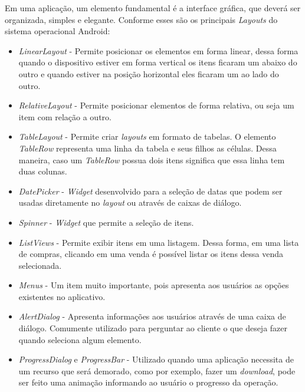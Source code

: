 	\par Em uma aplicação, um elemento fundamental é a interface gráfica, que
deverá ser organizada, simples e elegante. Conforme 
esses são os principais \textit{Layouts} do sistema operacional Android:
	\begin{itemize}
	
	 \item \textit{LinearLayout} - Permite posicionar os elementos em forma
	 linear, dessa forma quando o dispositivo estiver em forma vertical os itens
	 ficaram um abaixo do outro e quando estiver na posição horizontal eles
	 ficaram um ao lado do outro.
	
	  \item \textit{RelativeLayout} - Permite posicionar elementos de forma
	  relativa, ou seja um item com relação a outro.
	
	  \item \textit{TableLayout} - Permite criar \textit{layouts} em formato de
	  tabelas. O elemento \textit{TableRow} representa uma linha da tabela e seus
	  filhos as células.  Dessa maneira, caso um \textit{TableRow} possua dois
	  itens significa que essa linha tem duas colunas.
	
	  \item \textit{DatePicker} - \textit{Widget} desenvolvido para a seleção de
	  datas que podem ser usadas diretamente no \textit{layout} ou através de
	  caixas de diálogo.

	  \item \textit{Spinner} - \textit{Widget} que permite a seleção de itens. 
	
	  \item \textit{ListViews} - Permite exibir itens em uma listagem. Dessa
	  forma, em uma lista de compras, clicando em uma venda é possível listar os
	  itens dessa venda selecionada.
	
	  \item \textit{Menus} - Um item muito importante, pois apresenta aos usuários
	  as opções existentes no aplicativo.
	
	  \item \textit{AlertDialog} - Apresenta informações aos usuários através de
	  uma caixa de diálogo. Comumente utilizado para perguntar ao cliente o que
	  deseja fazer quando seleciona algum elemento.
	
	  \item \textit{ProgressDialog} e \textit{ProgressBar} - Utilizado quando uma
	  aplicação necessita de um recurso que será demorado, como por exemplo, fazer
	  um \textit{download}, pode ser feito uma animação informando ao usuário o
	  progresso da operação.
	
	\end{itemize}
	
